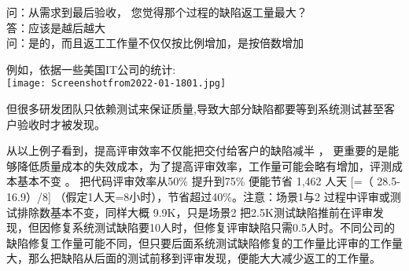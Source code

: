 问：从需求到最后验收， 您觉得那个过程的缺陷返工量最大？\\
答：应该是越后越大\\
问：是的，而且返工工作量不仅仅按比例增加，是按倍数增加

例如，依据一些美国IT公司的统计:\\

\texttt{[image: Screenshotfrom2022-01-1801.jpg]}

但很多研发团队只依赖测试来保证质量,导致大部分缺陷都要等到系统测试甚至客户验收时才被发现。


从以上例子看到，提高评审效率不仅能把交付给客户的缺陷减半 ，
更重要的是能够降低质量成本的失效成本，为了提高评审效率，工作量可能会略有增加，评测成本基本不变
。 把代码评审效率从50\% 提升到75\% 便能节省 1,462 人天 {[}=（
28.5-16.9）/8{]} （假定1人天=8小时），节省超过40\%。注意：场景1与2
过程中评审或测试排除数基本不变，同样大概 9.9K，只是场景2
把2.5K测试缺陷推前在评审发现，但因修复系统测试缺陷要10人时，但修复评审缺陷只需0.5人时。不同公司的缺陷修复工作量可能不同，但只要后面系统测试缺陷修复的工作量比评审的工作量大，那么把缺陷从后面的测试前移到评审发现，便能大大减少返工的工作量。

